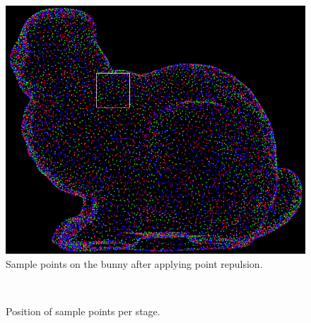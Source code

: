 \documentclass{article}
\begin{document}
\begin{figure}[h]
\centering
\includegraphics[scale=0.35]{./Pictures/pointrep_total.png}
\caption{Sample points on the bunny after applying point repulsion.}
\label{fig:turk_pointrepulsion_total}
\end{figure}

\begin{figure}[htbp]
  \begin{center}
    \mbox{
       \quad 
{} \quad
{}
      }
    \caption{Position of sample points per stage.}
    \label{fig:turk_before_during_after}
  \end{center}
\end{figure}
\end{document}
